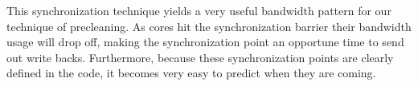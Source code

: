
This synchronization technique yields a very useful bandwidth pattern for our technique of precleaning. As cores hit the synchronization barrier their bandwidth usage will drop off, making the synchronization point an opportune time to send out write backs. Furthermore, because these synchronization points are clearly defined in the code, it becomes very easy to predict when they are coming.
